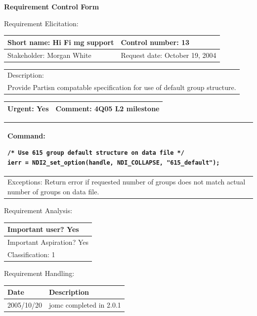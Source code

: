 \begin{center}\Large\bf
Requirement Control Form
\end{center}
\vspace{24pt}

Requirement Elicitation:

\begin{tabular}{|p{211pt}|p{211pt}|} \hline
Short name: Hi Fi mg support & Control number: 13\\ \hline
Stakeholder: Morgan White & Request date: October 19, 2004\\
\end{tabular}
\begin{tabular}{|p{433pt}|} \hline
Description: \\ 
Provide Partisn compatable specification for use of default group structure. \\
\hline
\end{tabular} 
\begin{tabular}{|p{211pt}|p{211pt}|} \hline
Urgent: Yes & Comment: 4Q05 L2 milestone \\ \hline
\end{tabular}

\vspace{12pt}

\begin{tabular}{|p{433pt}|} \hline
Command:
\begin{verbatim}
/* Use 615 group default structure on data file */
ierr = NDI2_set_option(handle, NDI_COLLAPSE, "615_default");
\end{verbatim} \\ \hline
Exceptions: Return error if requested number of groups does not match
actual number of groups on data file.  \\ \hline
\end{tabular}
\vspace{24pt}

Requirement Analysis:

\begin{tabular}{|p{433pt}|} \hline
Important user? Yes \\ \hline
Important Aspiration? Yes \\ \hline
Classification: 1 \\ \hline
\end{tabular}
\vspace{24pt}

Requirement Handling:

\begin{tabular}{|p{72pt}|p{351pt}|} \hline
Date & Description \\ \hline
2005/10/20 & jomc completed in 2.0.1 \\ \hline
\end{tabular}
